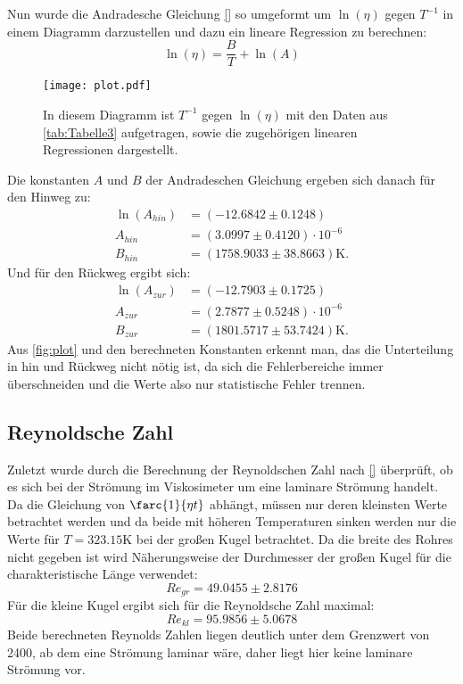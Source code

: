 Nun wurde die Andradesche Gleichung \eqref{} so umgeformt um $\ln\left(\eta\right)$ gegen $T^{-1}$ in einem Diagramm darzustellen und dazu ein lineare Regression zu berechnen:
\begin{equation*}
  \ln\left(\eta\right) = \frac{B}{T} + \ln\left(A\right)
\end{equation*}
\begin{figure}[H]
  \centering
  \texttt{[image: plot.pdf]}
  \caption{In diesem Diagramm ist $T^{-1}$ gegen $\ln\left(\eta\right)$ mit den Daten aus \autoref{tab:Tabelle3} aufgetragen, sowie die zugehörigen linearen Regressionen dargestellt.}
  \label{fig:plot}
\end{figure}
Die konstanten $A$ und $B$ der Andradeschen Gleichung ergeben sich danach für den Hinweg zu:
\begin{align*}
  \ln\left(A_{hin}\right) &= (-12.6842\pm 0.1248) \\
  A_{hin} &= (3.0997\pm 0.4120 ) \cdot 10^{-6} \\
  B_{hin} &= (1758.9033\pm 38.8663)\unit{\kelvin}.
\end{align*}
Und für den Rückweg ergibt sich:
\begin{align*}
  \ln\left(A_{zur}\right) &= (-12.7903\pm 0.1725) \\
  A_{zur} &= (2.7877\pm 0.5248 ) \cdot 10^{-6} \\
  B_{zur} &= (1801.5717\pm 53.7424)\unit{\kelvin}.
\end{align*}
Aus \autoref{fig:plot} und den berechneten Konstanten erkennt man, das die Unterteilung in hin und Rückweg nicht nötig ist, da sich die Fehlerbereiche
immer überschneiden und die Werte also nur statistische Fehler trennen.
\subsection{Reynoldsche Zahl}
Zuletzt wurde durch die Berechnung der Reynoldschen Zahl nach \eqref{} überprüft, ob es sich bei der
Strömung im Viskosimeter um eine laminare Strömung handelt. Da die Gleichung von $\farc{1}{\eta t}$ abhängt,
müssen nur deren kleinsten Werte betrachtet werden und da beide mit höheren Temperaturen sinken werden nur die Werte für
$T = 323.15\unit{\kelvin}$ bei der großen Kugel betrachtet. Da die breite des Rohres nicht gegeben ist wird Näherungsweise
der Durchmesser der großen Kugel für die charakteristische Länge verwendet:
\begin{equation*}
  Re_{gr} = 49.0455\pm 2.8176
\end{equation*}
Für die kleine Kugel ergibt sich für die Reynoldsche Zahl maximal:
\begin{equation*}
  Re_{kl} = 95.9856\pm 5.0678
\end{equation*}
Beide berechneten Reynolds Zahlen liegen deutlich unter dem Grenzwert von 2400, ab dem eine Strömung laminar wäre, daher liegt hier
keine laminare Strömung vor.